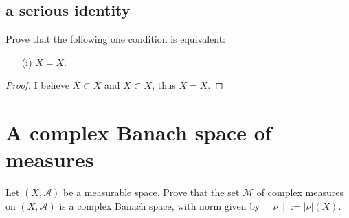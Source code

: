 \documentclass[lang=cn,11pt]{elegantbook}
\begin{document}
\subsection{a serious identity}
  Prove that the following one condition is equivalent: 
    \begin{itemize}
    \item[(i)]      $X=X$. 
    \end{itemize}
\begin{proof}
I believe $X \subset X$ and $X \subset X$, thus $X =X $.
\end{proof}


  \section {A complex Banach space of measures}
  Let $(X,\mathcal{A})$ be a measurable space. Prove that the set $\mathcal{M}$ of complex measures on $(X,\mathcal{A})$ is a complex Banach space, with norm given by $\|\nu\|:=|\nu|(X)$. 
\end{document}
